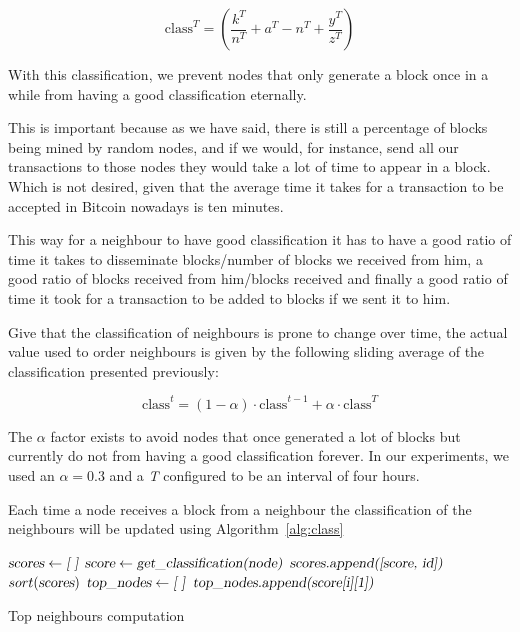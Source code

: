 \documentclass{dads}   %
\begin{document}
\begin{displaymath} \mbox{class}^{T}= (\dfrac{k^{T}}{n^{T}} + a^{T} - n^{T} + \dfrac{y^{T}}{z^{T}}) \end{displaymath}

With this classification, we prevent nodes that only generate a block once in a while from having a good classification eternally.

This is important because as we have said, there is still a percentage of blocks being mined by random nodes, and if we would, for instance, send all our transactions to those nodes they would take a lot of time to appear in a block. Which is not desired, given that the average time it takes for a transaction to be accepted in Bitcoin nowadays is ten minutes.

This way for a neighbour to have good classification it has to have a good ratio of time it takes to disseminate blocks/number of blocks we received from him, a good ratio of blocks received from him/blocks received and finally a good ratio of time it took for a transaction to be added to blocks if we sent it to him.

Give that the classification of neighbours is prone to change over time, the actual value used to order neighbours is given by the following sliding average of the classification presented previously:

\begin{displaymath} \mbox{class}^t = (1-\alpha) \cdot \mbox{class}^{t-1} + \alpha \cdot \mbox{class}^{T} \end{displaymath}

The $\alpha$ factor exists to avoid nodes that once generated a lot of blocks but currently do not from having a good classification forever. In our experiments, we used an $\alpha=0.3$ and a \textit{T} configured to be an interval of four hours.

Each time a node receives a block from a neighbour the classification of the neighbours will be updated using Algorithm~\ref{alg:class}

\begin{algorithm}[t]
\begin{algorithmic}[1]
\State $\textsl{scores} \gets \textsl{[ ]}$
  \State $\textsl{score} \gets \textsl{get\_classification(node)}$
  \State $\textsl{scores.append([score, id])}$
\EndFor
\State $sort(\textsl{scores})$
\State $\textsl{top\_nodes} \gets \textsl{[ ]}$
  \State $\textsl{top\_nodes.append(score[i][1])}$
\EndFor
\EndFunction
\end{algorithmic}
\caption{Top neighbours computation}
\label{alg:class}
\end{algorithm}
\end{document}
